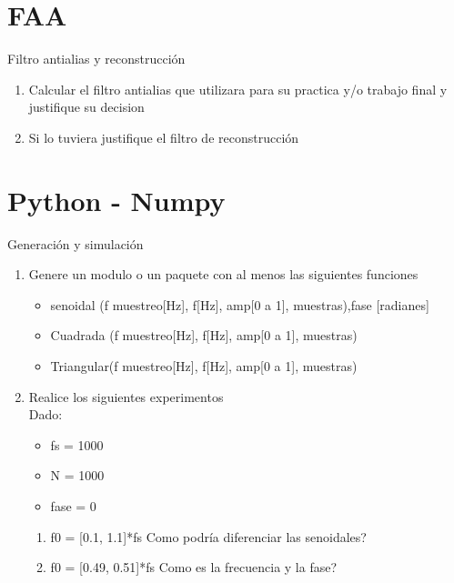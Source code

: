  \section{FAA}
 \begin{frame}{Filtro antialias y reconstrucción}
    \begin{enumerate}
       \item{Calcular el filtro antialias que utilizara para su practica y/o trabajo final y justifique su decision}
       \item{Si lo tuviera justifique el filtro de reconstrucción}
    \end{enumerate}
 \end{frame}
 \section{Python - Numpy}
 \begin{frame}{Generación y simulación}
    \begin{enumerate}
       \item{Genere un modulo o un paquete con al menos las siguientes funciones}
             \begin{itemize}
                \item{senoidal  (f muestreo[Hz], f[Hz], amp[0 a 1], muestras),fase [radianes]}
                \item{Cuadrada  (f muestreo[Hz], f[Hz], amp[0 a 1], muestras)}
                \item{Triangular(f muestreo[Hz], f[Hz], amp[0 a 1], muestras)}
             \end{itemize}
          \item{Realice los siguientes experimentos} \\
            Dado:
             \begin{itemize}
                \item{fs   = 1000}
                \item{N    = 1000}
                \item{fase = 0}
             \end{itemize}
             \begin{enumerate}
                \item{f0 = [0.1, 1.1]*fs}
                   Como podría diferenciar las senoidales?
                \item{f0 = [0.49, 0.51]*fs}
                   Como es la frecuencia y la fase?
             \end{enumerate}
    \end{enumerate}
 \end{frame}
